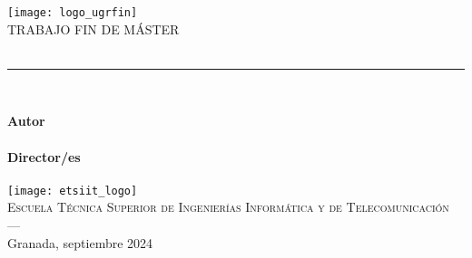 \begin{titlepage}

\newlength{\centeroffset}
\setlength{\centeroffset}{-0.5\oddsidemargin}
\addtolength{\centeroffset}{0.5\evensidemargin}
\thispagestyle{empty}

\noindent\hspace*{\centeroffset}\begin{minipage}{\textwidth}

\centering
\texttt{[image: logo\_ugrfin]}\\[1.4cm]

\textsc{ \Large TRABAJO FIN DE MÁSTER\\[0.2cm]}
% 
{\Huge\bfseries \tituloTFM \\ }
\noindent\rule[-1ex]{\textwidth}{3pt}\\[3.5ex]
{\fontsize{16pt}{18pt}\bfseries \subtituloTFM}
\end{minipage}

\vspace{0.5cm}
\noindent\hspace*{\centeroffset}\begin{minipage}{\textwidth}
\centering

\textbf{Autor}\\ {\estudiante}\\[2.5ex]
\textbf{Director/es}\\
{
    \ifthenelse{\equal{\tutorB}{}}{
      \tutorA
  }{
      \tutorA\\
      \tutorB
  }
}\\[2cm]

\texttt{[image: etsiit\_logo]}\\[0.1cm]
\textsc{Escuela Técnica Superior de Ingenierías Informática y de Telecomunicación}\\
\textsc{---}\\
Granada, septiembre 2024
\end{minipage}
\end{titlepage}


